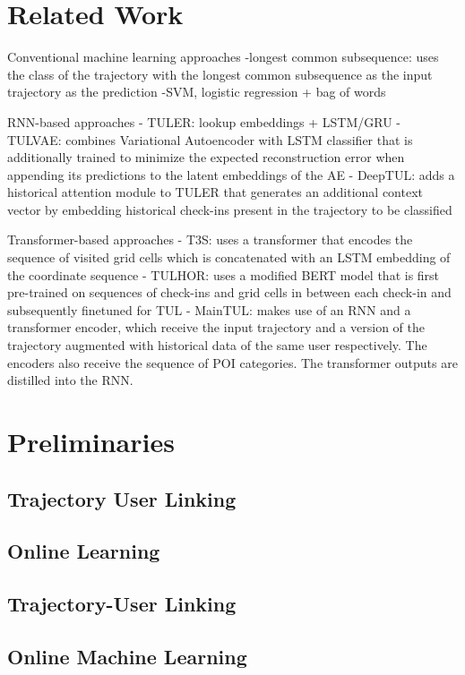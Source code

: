 \documentclass{article} %
\begin{document}
\section{Related Work}

Conventional machine learning approaches 
-longest common subsequence: uses the class of the trajectory with the longest common subsequence as the input trajectory as the prediction
-SVM, logistic regression + bag of words

RNN-based approaches
- TULER: lookup embeddings + LSTM/GRU
- TULVAE: combines Variational Autoencoder with LSTM classifier that is additionally trained to minimize the expected reconstruction error when appending its predictions to the latent embeddings of the AE
- DeepTUL: adds a historical attention module to TULER that generates an additional context vector by embedding historical check-ins present in the trajectory to be classified

Transformer-based approaches
- T3S: uses a transformer that encodes the sequence of visited grid cells which is concatenated with an LSTM embedding of the coordinate sequence
- TULHOR: uses a modified BERT model that is first pre-trained on sequences of check-ins and grid cells in between each check-in and subsequently finetuned for TUL
- MainTUL: makes use of an RNN and a transformer encoder, which receive the input trajectory and a version of the trajectory augmented with historical data of the same user respectively. The encoders also receive the sequence of POI categories. The transformer outputs are distilled into the RNN.



\section{Preliminaries}

\subsection{Trajectory User Linking}
\subsection{Online Learning}

\subsection{Trajectory-User Linking}

\subsection{Online Machine Learning}
\end{document}
